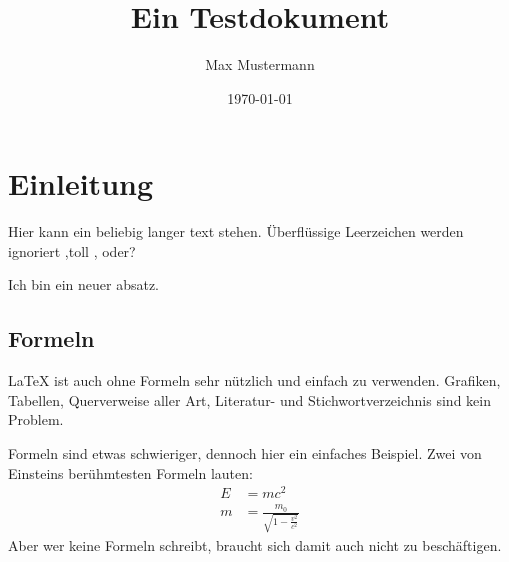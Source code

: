 \documentclass{scrartcl} %
\title{Ein Testdokument}
\author{Max Mustermann}
\date{\today}
\begin{document}
\maketitle %
\tableofcontents %
\section{Einleitung}
 
Hier kann ein beliebig langer text stehen.       Überflüssige Leerzeichen werden ignoriert
,toll , oder?
 
Ich bin ein neuer absatz.

\subsection{Formeln}
 
\LaTeX{} ist auch ohne Formeln sehr nützlich und
einfach zu verwenden. Grafiken, Tabellen,
Querverweise aller Art, Literatur- und
Stichwortverzeichnis sind kein Problem.
 
Formeln sind etwas schwieriger, dennoch hier ein
einfaches Beispiel.  Zwei von Einsteins
berühmtesten Formeln lauten:
\begin{align}
E &= mc^2                                  \\
m &= \frac{m_0}{\sqrt{1-\frac{v^2}{c^2}}}
\end{align}
Aber wer keine Formeln schreibt, braucht sich
damit auch nicht zu beschäftigen.
\end{document}
